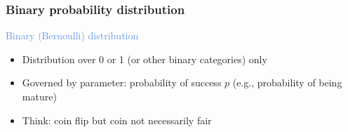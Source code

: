 \documentclass[dvipsnames]{beamer}
\begin{document}
\begin{frame}
 \frametitle{Binary probability distribution}
 \begin{center}
 \textcolor{CornflowerBlue}{Binary (Bernoulli) distribution}
 \end{center}

\begin{itemize}
  \item<only@2> Distribution over 0 or 1 (or other binary categories) only
  \item Governed by parameter: probability of success $p$ (e.g., probability of being mature)
  \item Think: coin flip but coin not necessarily fair
 \end{itemize}
\end{frame}
\end{document}
